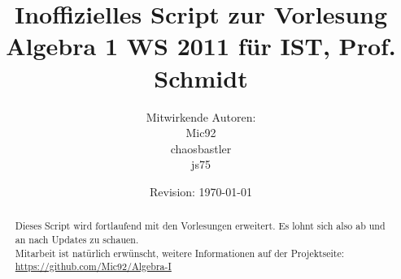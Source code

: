 \begin{titlepage}
\title{Inoffizielles Script zur Vorlesung Algebra 1 WS 2011 für IST, Prof. Schmidt}
\author{Mitwirkende Autoren:\\
Mic92
\\
chaosbastler
\\
js75
}
\date{Revision: \today}
\maketitle

\begin{abstract}
Dieses Script wird fortlaufend mit den Vorlesungen erweitert. Es lohnt sich also ab und an nach Updates zu schauen.
\\Mitarbeit ist natürlich erwünscht, weitere Informationen auf der Projektseite: \url{https://github.com/Mic92/Algebra-I}
\end{abstract}
\end{titlepage}
